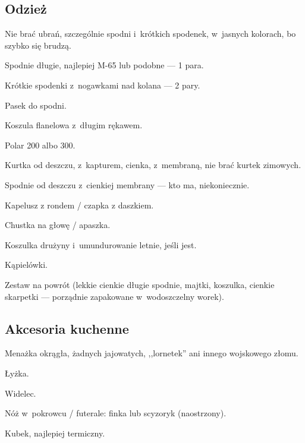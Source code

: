 \subsection{Odzież}
Nie brać ubrań, szczególnie spodni i~krótkich spodenek, w~jasnych kolorach, bo szybko się brudzą.
\begin{checklist}
\item Spodnie długie, najlepiej M-65 lub podobne --- 1 para.
\item Krótkie spodenki z~nogawkami nad kolana --- 2 pary.
\item Pasek do spodni.
\item Koszula flanelowa z~długim rękawem.
\item Polar 200 albo 300.
\item Kurtka od deszczu, z~kapturem, cienka, z~membraną, nie brać kurtek zimowych.
\item Spodnie od deszczu z~cienkiej membrany --- kto ma, niekoniecznie.
\item Kapelusz z rondem / czapka z daszkiem.
\item Chustka na głowę / apaszka.
\item Koszulka drużyny i~umundurowanie letnie, jeśli jest.
\item Kąpielówki.
\item Zestaw na powrót (lekkie cienkie długie spodnie, majtki, koszulka, cienkie skarpetki --- porządnie zapakowane w~wodoszczelny worek).
\end{checklist}

\subsection{Akcesoria kuchenne}
\begin{checklist}
\item Menażka okrągła, żadnych jajowatych, ,,lornetek'' ani innego wojskowego złomu.
\item Łyżka.
\item Widelec.
\item Nóż w~pokrowcu / futerale: finka lub scyzoryk (naostrzony).
\item Kubek, najlepiej termiczny.
\end{checklist}

